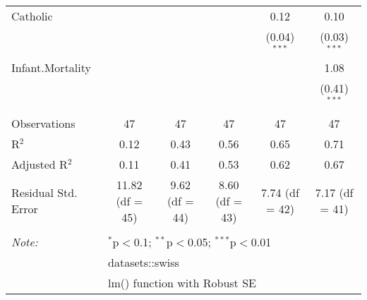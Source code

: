 \documentclass[
]{article}
\begin{document}
\begin{table}[!htbp]
\begin{tabular}{@{\extracolsep{5pt}}lccccc}
  Catholic &  &  &  & 0.12 & 0.10 \\ 
  &  &  &  & (0.04)$^{***}$ & (0.03)$^{***}$ \\ 
  Infant.Mortality &  &  &  &  & 1.08 \\ 
  &  &  &  &  & (0.41)$^{***}$ \\ 
 \hline \\[-1.8ex] 
Observations & 47 & 47 & 47 & 47 & 47 \\ 
R$^{2}$ & 0.12 & 0.43 & 0.56 & 0.65 & 0.71 \\ 
Adjusted R$^{2}$ & 0.11 & 0.41 & 0.53 & 0.62 & 0.67 \\ 
Residual Std. Error & 11.82 (df = 45) & 9.62 (df = 44) & 8.60 (df = 43) & 7.74 (df = 42) & 7.17 (df = 41) \\ 
\hline 
\hline \\[-1.8ex] 
\textit{Note:}  & \multicolumn{5}{l}{$^{*}$p$<$0.1; $^{**}$p$<$0.05; $^{***}$p$<$0.01} \\ 
 & \multicolumn{5}{l}{datasets::swiss} \\ 
 & \multicolumn{5}{l}{lm() function with Robust SE} \\ 
\end{tabular} 
\end{table}
\end{document}
